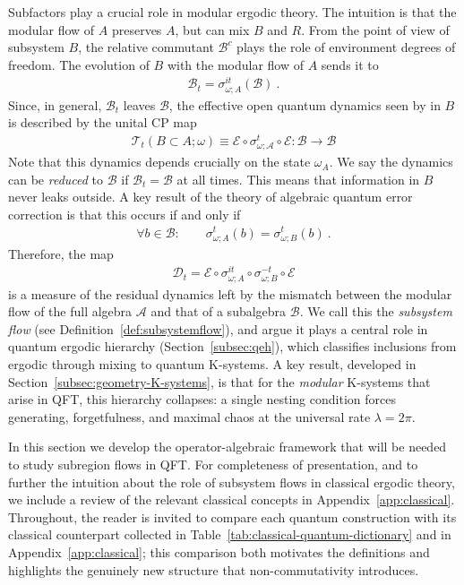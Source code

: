 \documentclass[a4paper,11pt]{article}
\theoremstyle{definition}
\theoremstyle{remark}
\newcommand{\mA}{\mathcal{A}}
\newcommand{\mB}{\mathcal{B}}
\newcommand{\mT}{\mathcal{T}}
\newcommand{\mE}{\mathcal{E}}
\begin{document}
Subfactors play a crucial role in modular ergodic theory. The intuition is that the modular flow of $A$ preserves $A$, but can mix $B$ and $R$. From the point of view of subsystem $B$, the relative commutant $\mB^c$ plays the role of environment degrees of freedom. The evolution of $B$ with the modular flow of $A$ sends it to 
\begin{align}
    \mB_t=\sigma_{\omega;A}^{it}(\mB)\ .
\end{align}
Since, in general, $\mB_t$ leaves $\mB$, the effective open quantum dynamics seen by in $B$ is described by the unital CP map
\begin{align}
    \mT_t(B\subset A;\omega)\equiv \mE\circ \sigma_{\omega;\mA}^t\circ \mE:\mB\to \mB
\end{align}
Note that this dynamics depends crucially on the state $\omega_A$. We say the dynamics can be {\it reduced} to $\mB$ if $\mB_t=\mB$ at all times. This means that information in $B$ never leaks outside. A key result of the theory of algebraic quantum error correction is that this occurs if and only if 
\begin{align}
    \forall b\in \mB: \qquad \sigma_{\omega;A}^t(b)=\sigma_{\omega;B}^t(b)\ .
\end{align}
Therefore, the map 
\begin{align}
    \mathcal{D}_t=\mE\circ \sigma_{\omega;A}^{it}\circ \sigma_{\omega;B}^{-t}\circ \mE
\end{align}
is a measure of the residual dynamics left by the
mismatch between the modular flow of the full algebra $\mA$ and that of a subalgebra
$\mB$. We call this the \emph{subsystem flow} 
(see Definition~\ref{def:subsystemflow}), and argue it plays a central role in quantum ergodic hierarchy (Section~\ref{subsec:qeh}), which classifies inclusions from ergodic through
mixing to quantum K-systems.  A key result, developed in
Section~\ref{subsec:geometry-K-systems}, is that for the \emph{modular} K-systems that
arise in QFT, this hierarchy collapses: a single nesting condition forces generating,
forgetfulness, and maximal chaos at the universal rate $\lambda=2\pi$.

In this section we develop the operator-algebraic framework that will be needed to
study subregion flows in QFT.  For completeness of presentation, and to further the intuition about the role of
subsystem flows in classical ergodic theory, we include a review of the relevant
classical concepts in Appendix~\ref{app:classical}. Throughout, the reader is invited to compare each
quantum construction with its classical counterpart collected in
Table~\ref{tab:classical-quantum-dictionary} and in Appendix~\ref{app:classical};
this comparison both motivates the definitions and highlights the genuinely new
structure that non-commutativity introduces.
 
\end{document}
